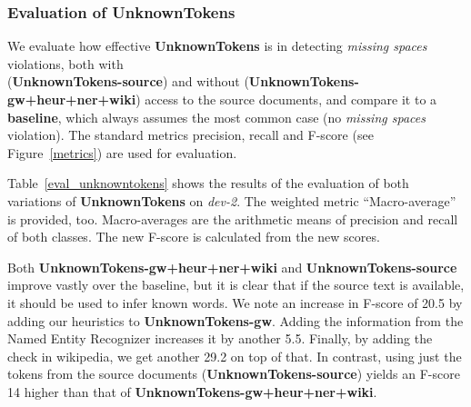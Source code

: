 \documentclass[a4paper,10pt]{scrartcl}
\theoremstyle{style}
\begin{document}
\subsubsection{Evaluation of UnknownTokens}
We evaluate how effective \textbf{UnknownTokens} is in detecting \textit{missing spaces} violations, both with\\ (\textbf{UnknownTokens-source}) and without (\textbf{UnknownTokens-gw+heur+ner+wiki}) access to the source documents, and compare it to a \textbf{baseline}, which always assumes the most common case (no \textit{missing spaces} violation).
The standard metrics precision, recall and F-score (see Figure~\ref{metrics}) are used for evaluation.

Table~\ref{eval_unknowntokens} shows the results of the evaluation of both variations of \textbf{UnknownTokens} on \textit{dev-2}. The weighted metric ``Macro-average'' is provided, too.
Macro-averages are the arithmetic means of precision and recall of both classes. The new F-score is calculated from the new scores.

Both \textbf{UnknownTokens-gw+heur+ner+wiki} and \textbf{UnknownTokens-source} improve vastly over the baseline, but it is clear that if the source text is available, it should be used to infer known words. We note an increase in F-score of 20.5 by adding our heuristics to \textbf{UnknownTokens-gw}. Adding the information from the Named Entity Recognizer increases it by another 5.5. Finally, by adding the check in wikipedia, we get another 29.2 on top of that.
In contrast, using just the tokens from the source documents (\textbf{UnknownTokens-source}) yields an F-score 14 higher than that of \textbf{UnknownTokens-gw+heur+ner+wiki}.
\end{document}
